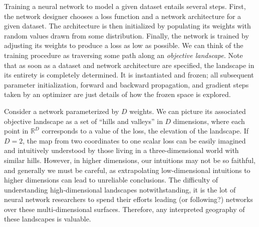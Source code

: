 \documentclass{article} %
\begin{document}
%
Training a neural network to model a given dataset entails several steps. First, the network designer chooses a loss function and a network architecture for a given dataset. The architecture is then initialized by populating its weights with random values drawn from some distribution. Finally, the network is trained by adjusting its weights to produce a loss as low as possible. We can think of the training procedure as traversing some path along an \emph{objective landscape}.
Note that as soon as a dataset and network architecture are specified, the landscape in its entirety is completely determined. It is instantiated and frozen; all subsequent parameter initialization, forward and backward propagation, and gradient steps taken by an optimizer are just details of how the frozen space is explored.


Consider a network parameterized by $D$ weights. We can picture its associated objective landscape as a set of ``hills and valleys'' in $D$ dimensions, where each point in $\mathbb{R}^D$ corresponds to a value of the loss, \ie the elevation of the landscape. If $D = 2$, the map from two coordinates to one scalar loss can be easily imagined and intuitively understood by those living in a three-dimensional world with similar hills.
%
However, in higher dimensions, our intuitions may not be so faithful, and generally we must be careful, as extrapolating low-dimensional intuitions to higher dimensions can lead to unreliable conclusions.
The difficulty of understanding high-dimensional landscapes notwithstanding, it is the lot of neural network researchers to spend their efforts leading (or following?) networks over these multi-dimensional surfaces. Therefore, any interpreted geography of these landscapes is valuable.
\end{document}
